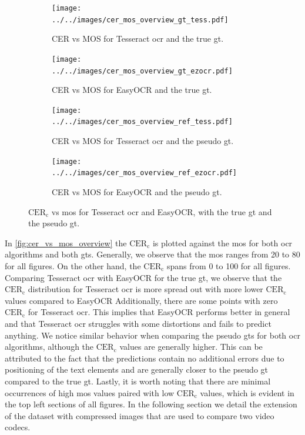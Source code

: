 \begin{figure}
    \begin{subfigure}[b]{0.45\textwidth}
        \centering
        \texttt{[image: ../../images/cer\_mos\_overview\_gt\_tess.pdf]}
        \caption{CER vs MOS for Tesseract \gls{ocr} and the true \gls{gt}.}
        \label{fig:cer_vs_mos_gt_tess}
    \end{subfigure}
    \hfill
    \begin{subfigure}[b]{0.45\textwidth}
        \centering
        \texttt{[image: ../../images/cer\_mos\_overview\_gt\_ezocr.pdf]}
        \caption{CER vs MOS for EasyOCR and the true \gls{gt}.}
        \label{fig:cer_vs_mos_gt_ocr}
    \end{subfigure}
    \newline
    \begin{subfigure}[b]{0.45\textwidth}
        \centering
        \texttt{[image: ../../images/cer\_mos\_overview\_ref\_tess.pdf]}
        \caption{CER vs MOS for Tesseract \gls{ocr} and the pseudo \gls{gt}.}
        \label{fig:cer_vs_mos_ref_tess}
    \end{subfigure}
    \hfill
    \begin{subfigure}[b]{0.45\textwidth}
        \centering
        \texttt{[image: ../../images/cer\_mos\_overview\_ref\_ezocr.pdf]}
        \caption{CER vs MOS for EasyOCR and the pseudo \gls{gt}.}
        \label{fig:cer_vs_mos_ref_ocr}
    \end{subfigure}
    \caption{$\text{CER}_{\text{c}}$ vs \gls{mos} for Tesseract \gls{ocr} and EasyOCR, with the true \gls{gt} and the pseudo \gls{gt}.}
    \label{fig:cer_vs_mos_overview}
\end{figure}

In \autoref{fig:cer_vs_mos_overview} the $\text{CER}_{\text{c}}$ is plotted against the \gls{mos} for both \gls{ocr} algorithms and both \glspl{gt}.
Generally, we observe that the \gls{mos} ranges from 20 to 80 for all figures.
On the other hand, the $\text{CER}_{\text{c}}$ spans from 0 to 100 for all figures.
Comparing Tesseract \gls{ocr} with EasyOCR for the true \gls{gt}, we observe that the $\text{CER}_{\text{c}}$ distribution for Tesseract \gls{ocr} is more spread out with more lower $\text{CER}_{\text{c}}$ values compared to EasyOCR
Additionally, there are some points with zero $\text{CER}_{\text{c}}$ for Tesseract \gls{ocr}.
This implies that EasyOCR performs better in general and that Tesseract \gls{ocr} struggles with some distortions and fails to predict anything.
We notice similar behavior when comparing the pseudo \glspl{gt} for both \gls{ocr} algorithms, although the $\text{CER}_{\text{c}}$ values are generally higher.
This can be attributed to the fact that the predictions contain no additional errors due to positioning of the text elements and are generally closer to the pseudo \gls{gt} compared to the true \gls{gt}.
Lastly, it is worth noting that there are minimal occurrences of high \gls{mos} values paired with low $\text{CER}_{\text{c}}$ values, which is evident in the top left sections of all figures.
In the following section we detail the extension of the dataset with compressed images that are used to compare two video codecs.


